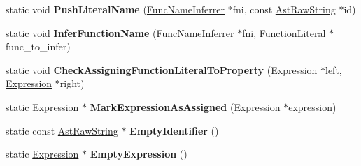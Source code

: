 \begin{DoxyCompactItemize}
\item 
static void {\bfseries Push\+Literal\+Name} (\hyperlink{classv8_1_1internal_1_1_func_name_inferrer}{Func\+Name\+Inferrer} $\ast$fni, const \hyperlink{classv8_1_1internal_1_1_ast_raw_string}{Ast\+Raw\+String} $\ast$id)\hypertarget{classv8_1_1internal_1_1_parser_traits_a3124d51842dcc66220a4cf3db0e254da}{}\label{classv8_1_1internal_1_1_parser_traits_a3124d51842dcc66220a4cf3db0e254da}

\item 
static void {\bfseries Infer\+Function\+Name} (\hyperlink{classv8_1_1internal_1_1_func_name_inferrer}{Func\+Name\+Inferrer} $\ast$fni, \hyperlink{classv8_1_1internal_1_1_function_literal}{Function\+Literal} $\ast$func\+\_\+to\+\_\+infer)\hypertarget{classv8_1_1internal_1_1_parser_traits_a1616044bda1b861847c29c9d7b8ecec7}{}\label{classv8_1_1internal_1_1_parser_traits_a1616044bda1b861847c29c9d7b8ecec7}

\item 
static void {\bfseries Check\+Assigning\+Function\+Literal\+To\+Property} (\hyperlink{classv8_1_1internal_1_1_expression}{Expression} $\ast$left, \hyperlink{classv8_1_1internal_1_1_expression}{Expression} $\ast$right)\hypertarget{classv8_1_1internal_1_1_parser_traits_a21739d8514cf648e427ff8c74df26375}{}\label{classv8_1_1internal_1_1_parser_traits_a21739d8514cf648e427ff8c74df26375}

\item 
static \hyperlink{classv8_1_1internal_1_1_expression}{Expression} $\ast$ {\bfseries Mark\+Expression\+As\+Assigned} (\hyperlink{classv8_1_1internal_1_1_expression}{Expression} $\ast$expression)\hypertarget{classv8_1_1internal_1_1_parser_traits_a99204d59464539b7468e8401aaf80bc5}{}\label{classv8_1_1internal_1_1_parser_traits_a99204d59464539b7468e8401aaf80bc5}

\item 
static const \hyperlink{classv8_1_1internal_1_1_ast_raw_string}{Ast\+Raw\+String} $\ast$ {\bfseries Empty\+Identifier} ()\hypertarget{classv8_1_1internal_1_1_parser_traits_a7851f72644ad747ea11af4739f96d234}{}\label{classv8_1_1internal_1_1_parser_traits_a7851f72644ad747ea11af4739f96d234}

\item 
static \hyperlink{classv8_1_1internal_1_1_expression}{Expression} $\ast$ {\bfseries Empty\+Expression} ()\hypertarget{classv8_1_1internal_1_1_parser_traits_a835157f245dd4e0aca90c1894ccf99f3}{}\label{classv8_1_1internal_1_1_parser_traits_a835157f245dd4e0aca90c1894ccf99f3}


\end{DoxyCompactItemize}

